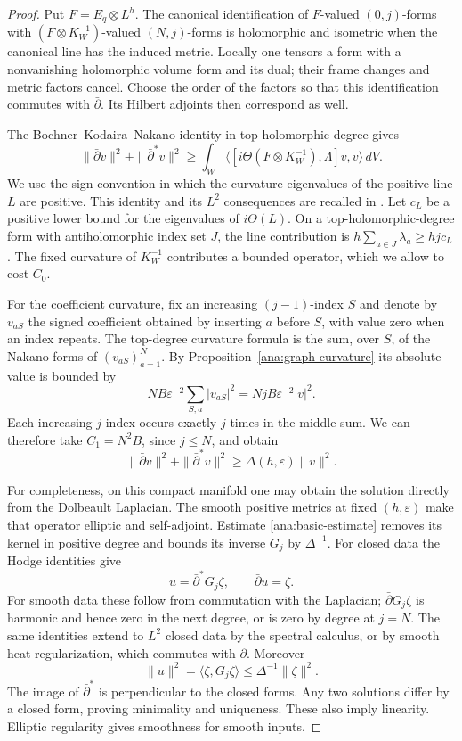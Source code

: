 \documentclass[11pt,reqno]{amsart}
\numberwithin{equation}{section}
\theoremstyle{definition}
\theoremstyle{remark}
\begin{document}
\begin{proof}
Put $F=E_q\otimes L^h$.  The canonical identification of $F$-valued
$(0,j)$-forms with $(F\otimes K_W^{-1})$-valued $(N,j)$-forms is
holomorphic and isometric when the canonical line has the induced
metric.  Locally one tensors a form with a nonvanishing holomorphic
volume form and its dual; their frame changes and metric factors
cancel.  Choose the order of the factors so that this identification
commutes with $\bar\partial$.  Its Hilbert adjoints then correspond
as well.

The Bochner--Kodaira--Nakano identity in top holomorphic degree gives
\[
 \|\bar\partial v\|^2+\|\bar\partial^*v\|^2
 \geq\int_W
 \langle[i\Theta(F\otimes K_W^{-1}),\Lambda]v,v\rangle\,dV.
\]
We use the sign convention in which the curvature eigenvalues of
the positive line $L$ are positive.  This identity and its $L^2$
consequences are recalled in \cite{Demailly,DemaillyL2}.
Let $c_L$ be a positive lower bound for the eigenvalues of $i\Theta(L)$.
On a top-holomorphic-degree form with antiholomorphic index set $J$,
the line contribution is
$h\sum_{a\in J}\lambda_a\geq hjc_L$.
The fixed curvature of $K_W^{-1}$ contributes a bounded operator,
which we allow to cost $C_0$.

For the coefficient curvature, fix an increasing $(j-1)$-index $S$
and denote by $v_{aS}$ the signed coefficient obtained by inserting
$a$ before $S$, with value zero when an index repeats.  The
top-degree curvature formula is the sum, over $S$, of the Nakano
forms of $(v_{aS})_{a=1}^N$.  By
Proposition~\ref{ana:graph-curvature} its absolute value is bounded
by
\[
 NB\varepsilon^{-2}\sum_{S,a}|v_{aS}|^2
 =NjB\varepsilon^{-2}|v|^2.
\]
Each increasing $j$-index occurs exactly $j$ times in the middle
sum.  We can therefore take $C_1=N^2B$, since $j\leq N$, and obtain
\begin{equation}\label{ana:basic-estimate}
 \|\bar\partial v\|^2+\|\bar\partial^*v\|^2
 \geq\Delta(h,\varepsilon)\|v\|^2.
\end{equation}

For completeness, on this compact manifold one may obtain the
solution directly from the Dolbeault Laplacian.  The smooth positive
metrics at fixed $(h,\varepsilon)$ make that operator elliptic and
self-adjoint.  Estimate \eqref{ana:basic-estimate} removes its kernel
in positive degree and bounds its inverse $G_j$ by $\Delta^{-1}$.
For closed data the Hodge identities give
\[
 u=\bar\partial^*G_j\zeta,
 \qquad \bar\partial u=\zeta.
\]
For smooth data these follow from commutation with the Laplacian;
$\bar\partial G_j\zeta$ is harmonic and hence zero in the next
degree, or is zero by degree at $j=N$.  The same identities extend
to $L^2$ closed data by the spectral calculus, or by smooth heat
regularization, which commutes with $\bar\partial$.  Moreover
\[
 \|u\|^2
 =\langle\zeta,G_j\zeta\rangle
 \leq\Delta^{-1}\|\zeta\|^2.
\]
The image of $\bar\partial^*$ is perpendicular to the closed forms.
Any two solutions differ by a closed form, proving minimality and
uniqueness.  These also imply linearity.  Elliptic regularity gives
smoothness for smooth inputs.
\end{proof}
\end{document}
